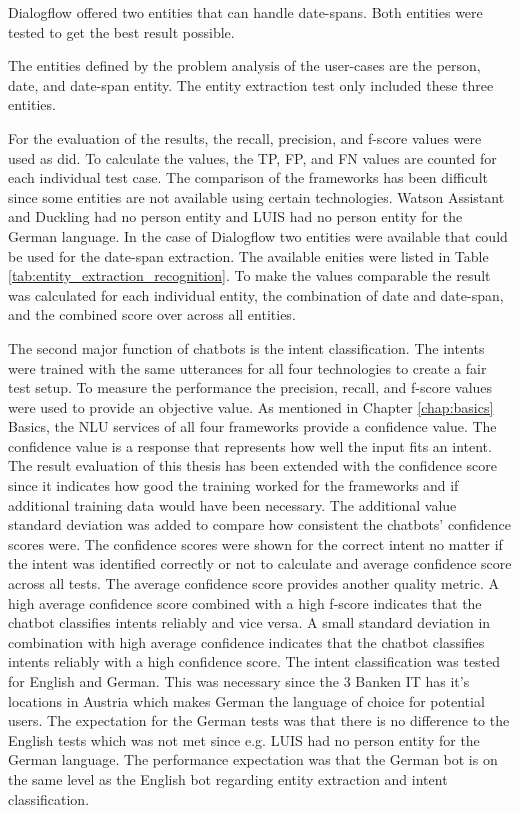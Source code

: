 Dialogflow offered two entities that can handle date-spans.
Both entities were tested to get the best result possible. 

The entities defined by the problem analysis of the user-cases are the person, date, and date-span entity.
The entity extraction test only included these three entities.

For the evaluation of the results, the recall, precision, and f-score values were used as \citet{braunEvaluatingNLU} did.
To calculate the values, the TP, FP, and FN values are counted for each individual test case.
The comparison of the frameworks has been difficult since some entities are not available using certain technologies.
Watson Assistant and Duckling had no person entity and LUIS had no person entity for the German language.
In the case of Dialogflow two entities were available that could be used for the date-span extraction.
The available enities were listed in Table \ref{tab:entity_extraction_recognition}.
To make the values comparable the result was calculated for each individual entity, the combination of date and date-span, and the combined score over across all entities.

The second major function of chatbots is the intent classification.
The intents were trained with the same utterances for all four technologies to create a fair test setup.
To measure the performance the precision, recall, and f-score values were used to provide an objective value.
As mentioned in Chapter \ref{chap:basics} Basics, the NLU services of all four frameworks provide a confidence value.
The confidence value is a response that represents how well the input fits an intent.
The result evaluation of this thesis has been extended with the confidence score since it indicates how good the training worked for the frameworks and if additional training data would have been necessary.
The additional value standard deviation was added to compare how consistent the chatbots' confidence scores were. 
The confidence scores were shown for the correct intent no matter if the intent was identified correctly or not to calculate and average confidence 
score across all tests.
The average confidence score provides another quality metric.
A high average confidence score combined with a high f-score indicates that the chatbot classifies intents reliably and vice versa.
A small standard deviation in combination with high average confidence indicates that the chatbot classifies intents reliably with a high confidence score. 
The intent classification was tested for English and German.
This was necessary since the 3 Banken IT has it's locations in Austria
which makes German the language of choice for potential users.
The expectation for the German tests was that there is no difference to the English tests which was not met since e.g. LUIS had no person entity for 
the German language.
The performance expectation was that the German bot is on the same level as the English bot regarding entity extraction and intent classification.

